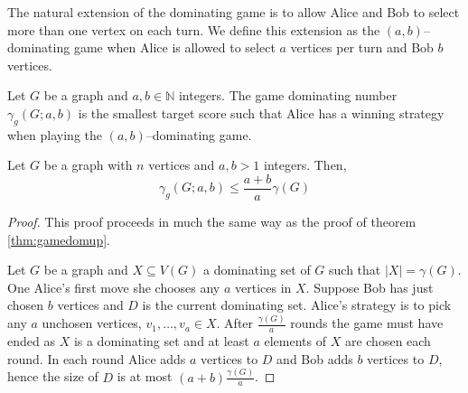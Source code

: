 The natural extension of the dominating game is to allow Alice and Bob to select more than one vertex on each turn. We define this extension as the $(a,b)$--dominating game when Alice is allowed to select $a$ vertices per turn and Bob $b$ vertices.

\begin{definition}
    Let $G$ be a graph and $a,b\in\mathbb{N}$ integers. The game dominating number $\gamma_g(G;a,b)$ is the smallest target score such that Alice has a winning strategy when playing the $(a,b)$--dominating game.
\end{definition}

\begin{theorem} 
    Let $G$ be a graph with $n$ vertices and $a,b>1$ integers. Then,
    \[\gamma_{g}(G;a,b) \leq \frac{a+b}{a}\gamma(G)\]
\end{theorem}
\begin{proof}
    This proof proceeds in much the same way as the proof of theorem \ref{thm:gamedomup}.
    
   Let $G$ be a graph and $X\subseteq V(G)$ a dominating set of $G$ such that $|X| = \gamma(G)$. One Alice's first move she chooses any $a$ vertices in $X$. Suppose Bob has just chosen $b$ vertices and $D$ is the current dominating set. Alice's strategy is to pick any $a$ unchosen vertices, $v_1,\dots,v_a \in X$. After $\frac{\gamma(G)}{a}$ rounds the game must have ended as $X$ is a dominating set and at least $a$ elements of $X$ are chosen each round. In each round Alice adds $a$ vertices to $D$ and Bob adds $b$ vertices to $D$, hence the size of $D$ is at most $(a+b)\frac{\gamma(G)}{a}$.
\end{proof}













